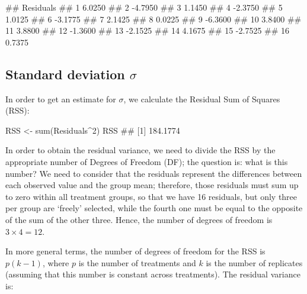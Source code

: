 \documentclass[a4paper,12pt,oneside]{book}
\newenvironment{Shaded}{\begin{snugshade}}{\end{snugshade}}
\newcommand{\DecValTok}[1]{#1}
\newcommand{\SpecialCharTok}[1]{#1}
\newcommand{\DocumentationTok}[1]{#1}
\newcommand{\OtherTok}[1]{#1}
\newcommand{\FunctionTok}[1]{#1}
\newcommand{\NormalTok}[1]{#1}
\begin{document}
\begin{Shaded}
\begin{Highlighting}[]
\DocumentationTok{\#\#    Residuals}
\DocumentationTok{\#\# 1     6.0250}
\DocumentationTok{\#\# 2    {-}4.7950}
\DocumentationTok{\#\# 3     1.1450}
\DocumentationTok{\#\# 4    {-}2.3750}
\DocumentationTok{\#\# 5     1.0125}
\DocumentationTok{\#\# 6    {-}3.1775}
\DocumentationTok{\#\# 7     2.1425}
\DocumentationTok{\#\# 8     0.0225}
\DocumentationTok{\#\# 9    {-}6.3600}
\DocumentationTok{\#\# 10    3.8400}
\DocumentationTok{\#\# 11    3.8800}
\DocumentationTok{\#\# 12   {-}1.3600}
\DocumentationTok{\#\# 13   {-}2.1525}
\DocumentationTok{\#\# 14    4.1675}
\DocumentationTok{\#\# 15   {-}2.7525}
\DocumentationTok{\#\# 16    0.7375}
\end{Highlighting}
\end{Shaded}

\hypertarget{standard-deviation-sigma}{%
\subsection{\texorpdfstring{Standard deviation \(\sigma\)}{Standard deviation \textbackslash sigma}}\label{standard-deviation-sigma}}

In order to get an estimate for \(\sigma\), we calculate the Residual Sum of Squares (RSS):

\vspace{12pt}

\begin{Shaded}
\begin{Highlighting}[]
\NormalTok{RSS }\OtherTok{\textless{}{-}} \FunctionTok{sum}\NormalTok{(Residuals}\SpecialCharTok{\^{}}\DecValTok{2}\NormalTok{)}
\NormalTok{RSS}
\DocumentationTok{\#\# [1] 184.1774}
\end{Highlighting}
\end{Shaded}

In order to obtain the residual variance, we need to divide the RSS by the appropriate number of Degrees of Freedom (DF); the question is: what is this number? We need to consider that the residuals represent the differences between each observed value and the group mean; therefore, those residuals must sum up to zero within all treatment groups, so that we have 16 residuals, but only three per group are `freely' selected, while the fourth one must be equal to the opposite of the sum of the other three. Hence, the number of degrees of freedom is \(3 \times 4 = 12\).

In more general terms, the number of degrees of freedom for the RSS is \(p (k -1)\), where \(p\) is the number of treatments and \(k\) is the number of replicates (assuming that this number is constant across treatments). The residual variance is:
\end{document}
